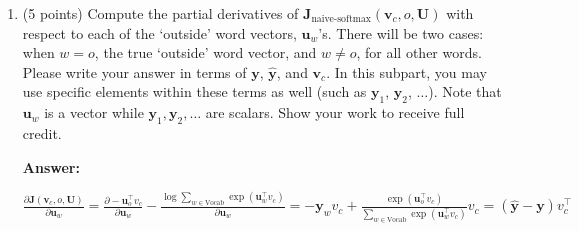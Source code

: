 \documentclass{article}
\newenvironment{answer}{
    {\bf Answer:} \sf \begingroup\color{red}
}{\endgroup}%
\begin{document}
\begin{enumerate}[label=(\alph*)]
\begin{shaded}
\begin{answer}
\begin{enumerate}[label=(\roman*)]
    \item
    Firstly, in most cases, L2 normalization does not take away useful information for the downstream task and is common practice in most downstream applications. In sentiment analysis, the sentiment of a phrase is usually determined by the relative positions of the word embeddings in the feature space rather than their magnitudes. In such cases, L2 normalization can actually improve the discriminative power of the embeddings by making them more invariant to differences in scale. \\
    However, there is a case where L2 normalization can take away useful information for the downstream task. Following the hint, consider the case where $\bm u_{x} = \alpha \bm u_{y}$ for some words $x \neq y$ and some scalar $\alpha$. In this case, L2 normalization would make the embeddings of these words indistinguishable from each other, as they would have the same direction and hence the same normalized form. This can be problematic for downstream tasks that require differentiation between words with similar directions but different magnitudes.
\end{enumerate}
\end{answer}
\end{shaded}

\item (5 points) Compute the partial derivatives of $\bm J_{\text{naive-softmax}}(\bm v_c, o, \bm U)$ with respect to each of the `outside' word vectors, $\bm u_w$'s. There will be two cases: when $w=o$, the true `outside' word vector, and $w \neq o$, for all other words. Please write your answer in terms of $\bm y$, $\hat{\bm y}$, and $\bm v_c$. In this subpart, you may use specific elements within these terms as well (such as $\bm y_1$, $\bm y_2$, $\dots$). Note that $\bm u_w$ is a vector while $\bm y_1, \bm y_2, \dots$ are scalars. Show your work to receive full credit.

\begin{shaded}
\begin{answer}
$\frac{\partial \bm J(\bm v_c, o, \bm U)}{\partial \bm u_w} 
    = \frac{\partial -\bm u_{o}^\top v_c}{\partial \bm u_w} - \frac{\log \sum_{w \in \text{Vocab}} \exp(\bm u_{w}^\top v_c)}{\partial \bm u_w} 
    = - \bm y_w v_c + \frac{\exp(\bm u_{o}^\top v_c)}{\sum_{w \in \text{Vocab}} \exp(\bm u_{w}^\top v_c)} v_c
    = (\hat{\bm y} - \bm y) v_{c}^\top $
\end{answer}
\end{shaded}


\end{enumerate}
\end{document}
